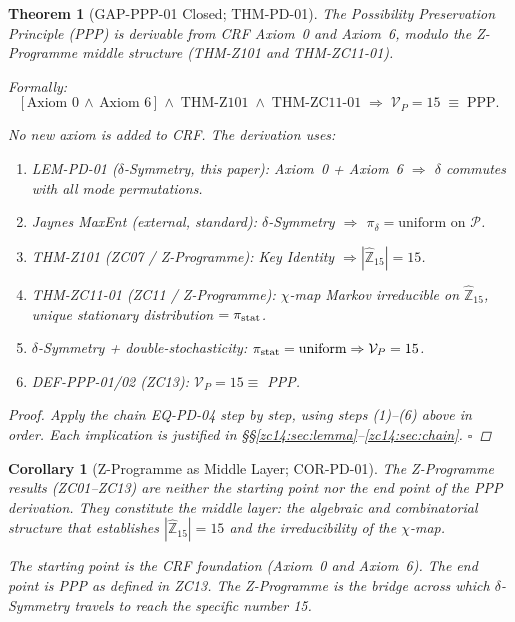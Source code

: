 \documentclass[12pt, a4paper]{article}
\newtheorem{theorem}{Theorem}[section]
\newtheorem{corollary}{Corollary}[section]
\begin{document}
\begin{theorem}[GAP-PPP-01 Closed; THM-PD-01]
\label{zc14:thm:gap-closed}
The Possibility Preservation Principle (PPP) is derivable
from CRF Axiom~0 and Axiom~6, modulo the Z-Programme middle
structure (THM-Z101 and THM-ZC11-01).

Formally:
\[
  \big[\,\text{Axiom~0} \,\wedge\, \text{Axiom~6}\,\big]
  \;\wedge\;\text{THM-Z101}\;\wedge\;\text{THM-ZC11-01}
  \;\Longrightarrow\;\mathcal{V}_P = 15 \;\equiv\; \text{PPP}.
  \tag{EQ-PD-05}\label{zc14:eq:thm-pd-01}
\]

No new axiom is added to CRF. The derivation uses:
\begin{enumerate}[leftmargin=*, noitemsep]
  \item LEM-PD-01 ($\delta$-Symmetry, this paper):
    Axiom~0 + Axiom~6 $\Rightarrow$ $\delta$ commutes
    with all mode permutations.
  \item Jaynes MaxEnt (external, standard): $\delta$-Symmetry
    $\Rightarrow$ $\pi_\delta = \text{uniform on } \mathcal{P}$.
  \item THM-Z101 (ZC07 / Z-Programme): Key Identity
    $\Rightarrow |\widehat{\mathbb{Z}}_{15}| = 15$.
  \item THM-ZC11-01 (ZC11 / Z-Programme): $\chi$-map
    Markov irreducible on $\widehat{\mathbb{Z}}_{15}$,
    unique stationary distribution $= \pi_{\rm stat}$.
  \item $\delta$-Symmetry + double-stochasticity: $\pi_{\rm stat}
    = \text{uniform} \Rightarrow \mathcal{V}_P = 15$.
  \item DEF-PPP-01/02 (ZC13): $\mathcal{V}_P = 15 \equiv$ PPP.
\end{enumerate}

\begin{proof}
Apply the chain EQ-PD-04 step by step, using steps (1)--(6)
above in order. Each implication is justified in
\S\S\ref{zc14:sec:lemma}--\ref{zc14:sec:chain}. \hfill$\square$
\end{proof}
\end{theorem}

\begin{corollary}[Z-Programme as Middle Layer; COR-PD-01]
\label{zc14:cor:middle-layer}
The Z-Programme results (ZC01--ZC13) are neither the starting
point nor the end point of the PPP derivation. They constitute
the \emph{middle layer}: the algebraic and combinatorial
structure that establishes $|\widehat{\mathbb{Z}}_{15}|=15$
and the irreducibility of the $\chi$-map.

The starting point is the CRF foundation (Axiom~0 and Axiom~6).
The end point is PPP as defined in ZC13. The Z-Programme is the
\emph{bridge} across which $\delta$-Symmetry travels to reach
the specific number 15.
\end{corollary}
\end{document}
